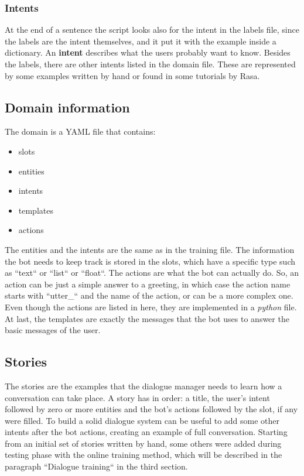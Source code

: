 \documentclass[11pt,a4paper]{article}
\begin{document}
\subsubsection{Intents}
\qquad At the end of a sentence the script looks also for the intent in the labels file, since the labels are the intent themselves, and it put it with the example inside a dictionary. An \textbf{intent} describes what the users probably want to know. Besides the labels, there are other intents listed in the domain file. These are represented by some examples written by hand or found in some tutorials by Rasa.

\subsection{Domain information}
\qquad The domain is a YAML file that contains:
\begin{itemize}
	\item slots
	\item entities
	\item intents
	\item templates
	\item actions
\end{itemize}
The entities and the intents are the same as in the training file. The information the bot needs to keep track is stored in the slots, which have a specific type such as ``text`` or ``list`` or ``float``. The actions are what the bot can actually do. So, an action can be just a simple answer to a greeting, in which case the action name starts with ``utter\_`` and the name of the action, or can be a more complex one. Even though the actions are listed in here, they are implemented in a \textit{python} file. At last, the templates are exactly the messages that the bot uses to answer the basic messages of the user.
\subsection{Stories}
\qquad The stories are the examples that the dialogue manager needs to learn how a conversation can take place. A story has in order: a title, the user's intent followed by zero or more entities and the bot's actions followed by the slot, if any were filled. To build a solid dialogue system can be useful to add some other intents after the bot actions, creating an example of full conversation. Starting from an initial set of stories written by hand, some others were added during testing phase with the online training method, which will be described in the paragraph ``Dialogue training`` in the third section.
\end{document}
